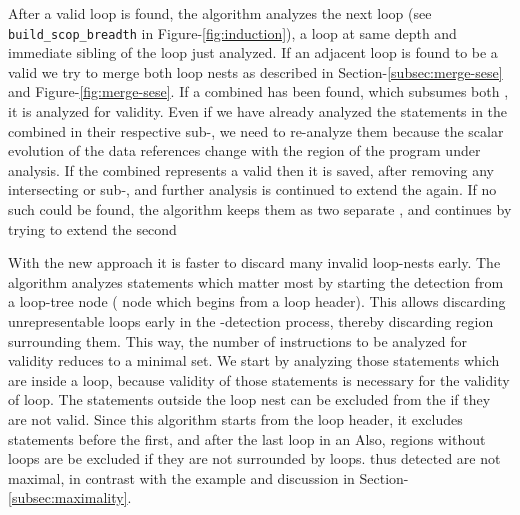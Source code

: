 \documentclass{sig-alternate}
\begin{document}
After a valid loop is found, the algorithm analyzes the next loop
(see \texttt{build\_scop\_breadth} in Figure-\ref{fig:induction}), a loop at
same depth and immediate sibling of the loop just analyzed.  If an adjacent loop
is found to be a valid \SCoP{,} we try to merge both loop nests as described in
Section-\ref{subsec:merge-sese} and Figure-\ref{fig:merge-sese}.  If a combined
\SESE{} has been found, which subsumes both , it is analyzed for
validity. Even if we have already analyzed the statements in the combined \SESE{}
in their respective sub-, we need to re-analyze them because the scalar
evolution of the data references change with the region of the program under
analysis. If the combined \SESE{} represents a valid \SCoP{,} then it is saved, after
removing any intersecting or sub-, and further analysis is continued to
extend the \SCoP{} again.  If no such \SESE{} could be found, the algorithm keeps them
as two separate , and continues by trying to extend the second 

With the new approach it is faster to discard many invalid loop-nests early. The
algorithm analyzes statements which matter most by starting the \SCoP{} detection
from a loop-tree node (\CFG{} node which begins from a loop header). This allows
discarding unrepresentable loops early in the \SCoP{}-detection process, thereby
discarding \SESE{} region surrounding them.  This way, the number of instructions
to be analyzed for validity reduces to a minimal set.  We start by analyzing
those statements which are inside a loop, because validity of those statements
is necessary for the validity of loop.  The statements outside the loop nest can
be excluded from the \SESE{} if they are not valid.  Since this algorithm starts
from the loop header, it excludes statements before the first, and after
the last loop in an   Also, regions without loops are be excluded if they
are not surrounded by loops.   thus detected are not maximal, in contrast
with the example and discussion in Section-\ref{subsec:maximality}.
\end{document}
